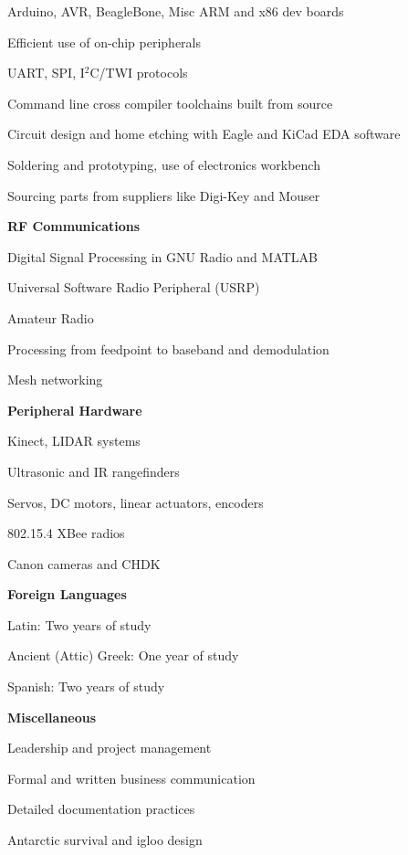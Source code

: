 \documentclass[10pt,letterpaper]{article}
\begin{document}
\begin{itemize*}
\begin{itemize*}
            \item Arduino, AVR, BeagleBone, Misc ARM and x86 dev boards
            \item Efficient use of on-chip peripherals
            \item UART, SPI, I$^2$C/TWI protocols
            \item Command line cross compiler toolchains built from source
            \item Circuit design and home etching with Eagle and KiCad EDA software
            \item Soldering and prototyping, use of electronics workbench
            \item Sourcing parts from suppliers like Digi-Key and Mouser
        \end{itemize*}
    \item \textbf{RF Communications}
        \begin{itemize*}
            \item Digital Signal Processing in GNU Radio and MATLAB
            \item Universal Software Radio Peripheral (USRP)
            \item Amateur Radio
            \item Processing from feedpoint to baseband and demodulation
            \item Mesh networking
        \end{itemize*}
    \item \textbf{Peripheral Hardware}
        \begin{itemize*}
            \item Kinect, LIDAR systems
            \item Ultrasonic and IR rangefinders
            \item Servos, DC motors, linear actuators, encoders
            \item 802.15.4 XBee radios
            \item Canon cameras and CHDK
        \end{itemize*}
    \item \textbf{Foreign Languages}
        \begin{itemize*}
            \item Latin: Two years of study
            \item Ancient (Attic) Greek: One year of study
            \item Spanish: Two years of study
        \end{itemize*}
    \item \textbf{Miscellaneous}
        \begin{itemize*}
            \item Leadership and project management
            \item Formal and written business communication
            \item Detailed documentation practices
            \item Antarctic survival and igloo design
        \end{itemize*}
\end{itemize*}
\end{document}
